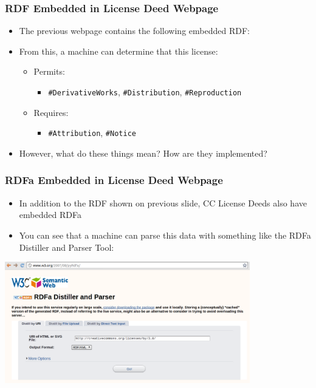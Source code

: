 \documentclass[mathserif,xcolor=dvipsnames,handout]{beamer}
\begin{document}
\begin{frame}[fragile]
\frametitle{RDF Embedded in License Deed Webpage}
        \begin{itemize}
            \item The previous webpage contains the following embedded RDF:
        \end{itemize}

        \begin{itemize}
            \item From this, a machine can determine that this license:
            \begin{itemize}
                \item Permits:
                    \begin{itemize}
                        \item \texttt{\#DerivativeWorks}, \texttt{\#Distribution}, \texttt{\#Reproduction}
                    \end{itemize}
                \item Requires:
                    \begin{itemize}
                        \item \texttt{\#Attribution}, \texttt{\#Notice}
                    \end{itemize}
            \end{itemize}
            \item However, what do these things mean?  How are they implemented?
        \end{itemize}
\end{frame}

\begin{frame}[t]
\frametitle{RDFa Embedded in License Deed Webpage}
        \begin{itemize}
            \item In addition to the RDF shown on previous slide, CC License Deeds also have embedded RDFa
            \item You can see that a machine can parse this data with something
            like the RDFa Distiller and Parser Tool:
        \end{itemize}
        \begin{center}
            \includegraphics[width=0.8\textwidth]{RDFa-distiller.png}
        \end{center}
\end{frame}
\end{document}
